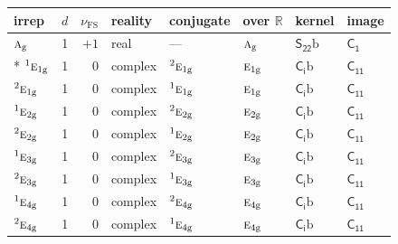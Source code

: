 \documentclass[10pt,a4paper]{article}
\numberwithin{equation}{section}
\newcommand{\grp}[1]{\mathsf{#1}}
\newcommand{\irr}[1]{\text{\normalfont\scshape #1}}
\newcommand{\conjpair}[1]{{}^{#1}}
\newcommand{\ptag}[1]{\mathrm{#1}}
\newcommand{\fsind}{\nu_{\mathrm{FS}}}
\newcommand{\secondclass}{\mathrm{b}}
\begin{document}
{\small\renewcommand{\arraystretch}{1.25}\setlength{\tabcolsep}{4pt}\begin{longtable}{@{}lrrlllll@{}}\toprule
irrep & $d$ & $\fsind$ & reality & conjugate & over $\mathbb{R}$ & kernel & image\\\midrule\endhead
\bottomrule\endfoot\endlastfoot
$\irr{a}_{\ptag{g}}$ & 1 & $+1$ & real & --- & $\irr{a}_{\ptag{g}}$ & \href{S22b.pdf}{$\grp{S_{22}}\secondclass$} & \href{../../../rotation/data/pdf/C1.pdf}{$\grp{C_{1}}$}\\*
$\conjpair{1}\irr{e}_{1\ptag{g}}$ & 1 & $0$ & complex & $\conjpair{2}\irr{e}_{1\ptag{g}}$ & $\irr{e}_{1\ptag{g}}$ & \href{S2b.pdf}{$\grp{C_{i}}\secondclass$} & \href{../../../rotation/data/pdf/C11.pdf}{$\grp{C_{11}}$}\\
$\conjpair{2}\irr{e}_{1\ptag{g}}$ & 1 & $0$ & complex & $\conjpair{1}\irr{e}_{1\ptag{g}}$ & $\irr{e}_{1\ptag{g}}$ & \href{S2b.pdf}{$\grp{C_{i}}\secondclass$} & \href{../../../rotation/data/pdf/C11.pdf}{$\grp{C_{11}}$}\\
$\conjpair{1}\irr{e}_{2\ptag{g}}$ & 1 & $0$ & complex & $\conjpair{2}\irr{e}_{2\ptag{g}}$ & $\irr{e}_{2\ptag{g}}$ & \href{S2b.pdf}{$\grp{C_{i}}\secondclass$} & \href{../../../rotation/data/pdf/C11.pdf}{$\grp{C_{11}}$}\\
$\conjpair{2}\irr{e}_{2\ptag{g}}$ & 1 & $0$ & complex & $\conjpair{1}\irr{e}_{2\ptag{g}}$ & $\irr{e}_{2\ptag{g}}$ & \href{S2b.pdf}{$\grp{C_{i}}\secondclass$} & \href{../../../rotation/data/pdf/C11.pdf}{$\grp{C_{11}}$}\\
$\conjpair{1}\irr{e}_{3\ptag{g}}$ & 1 & $0$ & complex & $\conjpair{2}\irr{e}_{3\ptag{g}}$ & $\irr{e}_{3\ptag{g}}$ & \href{S2b.pdf}{$\grp{C_{i}}\secondclass$} & \href{../../../rotation/data/pdf/C11.pdf}{$\grp{C_{11}}$}\\
$\conjpair{2}\irr{e}_{3\ptag{g}}$ & 1 & $0$ & complex & $\conjpair{1}\irr{e}_{3\ptag{g}}$ & $\irr{e}_{3\ptag{g}}$ & \href{S2b.pdf}{$\grp{C_{i}}\secondclass$} & \href{../../../rotation/data/pdf/C11.pdf}{$\grp{C_{11}}$}\\
$\conjpair{1}\irr{e}_{4\ptag{g}}$ & 1 & $0$ & complex & $\conjpair{2}\irr{e}_{4\ptag{g}}$ & $\irr{e}_{4\ptag{g}}$ & \href{S2b.pdf}{$\grp{C_{i}}\secondclass$} & \href{../../../rotation/data/pdf/C11.pdf}{$\grp{C_{11}}$}\\
$\conjpair{2}\irr{e}_{4\ptag{g}}$ & 1 & $0$ & complex & $\conjpair{1}\irr{e}_{4\ptag{g}}$ & $\irr{e}_{4\ptag{g}}$ & \href{S2b.pdf}{$\grp{C_{i}}\secondclass$} & \href{../../../rotation/data/pdf/C11.pdf}{$\grp{C_{11}}$}\\

\end{longtable}}
\end{document}

